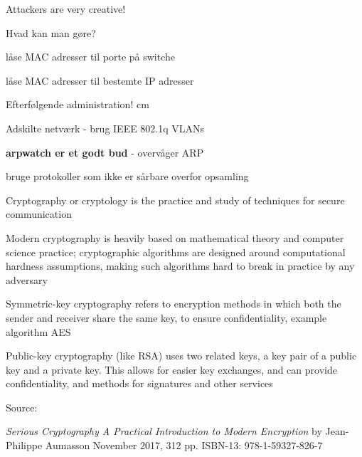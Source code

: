 \documentclass[Screen16to9,17pt]{foils}
\begin{document}
\vskip 1cm
\centerline{\Large Attackers are very creative!}


\begin{list1}
\item Hvad kan man gøre?
\item låse MAC adresser til porte på switche
\item låse MAC adresser til bestemte IP adresser
\item Efterfølgende administration!
 cm
\item Adskilte netværk - brug IEEE 802.1q VLANs
\item {\bfseries arpwatch er et godt bud} - overvåger ARP
\item bruge protokoller som ikke er sårbare overfor opsamling
\end{list1}










\begin{list1}
\item Cryptography or cryptology is the practice and study of techniques for secure communication
\item Modern cryptography is heavily based on mathematical theory and computer science practice; cryptographic algorithms are designed around computational hardness assumptions, making such algorithms hard to break in practice by any adversary
\item Symmetric-key cryptography refers to encryption methods in which both the sender and receiver share the same key, to ensure confidentiality, example algorithm AES
\item Public-key cryptography (like RSA) uses two related keys, a key pair of a public key and a private key. This allows for easier key exchanges, and can provide confidentiality, and methods for signatures and other services
\end{list1}

Source: 





\emph{Serious Cryptography
A Practical Introduction to Modern Encryption}
by Jean-Philippe Aumasson
November 2017, 312 pp.
ISBN-13:
978-1-59327-826-7
\end{document}
